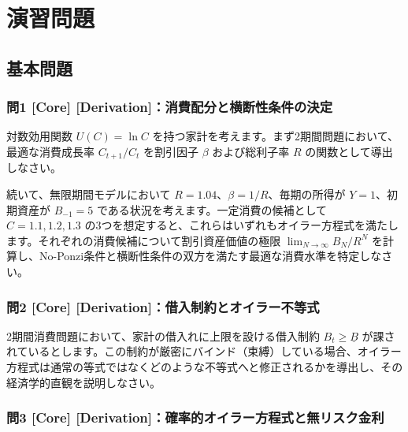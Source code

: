 \documentclass[
  japanese,
  lualatex,
  ja=standard,
  12pt,
  a4paper]{ltjsarticle}
\begin{document}
\section{演習問題}\label{ux6f14ux7fd2ux554fux984c}

\subsection{基本問題}\label{ux57faux672cux554fux984c}

\subsubsection{問1 {[}Core{]}
{[}Derivation{]}：消費配分と横断性条件の決定}\label{ux554f1-core-derivationux6d88ux8cbbux914dux5206ux3068ux6a2aux65adux6027ux6761ux4ef6ux306eux6c7aux5b9a}

対数効用関数 \(U(C) = \ln C\)
を持つ家計を考えます。まず2期間問題において、最適な消費成長率
\(C_{t+1}/C_t\) を割引因子 \(\beta\) および総利子率 \(R\)
の関数として導出しなさい。

続いて、無限期間モデルにおいて \(R=1.04\)、\(\beta=1/R\)、毎期の所得が
\(Y=1\)、初期資産が \(B_{-1}=5\)
である状況を考えます。一定消費の候補として \(C=1.1, 1.2, 1.3\)
の3つを想定すると、これらはいずれもオイラー方程式を満たします。それぞれの消費候補について割引資産価値の極限
\(\lim_{N\to\infty} B_N/R^N\)
を計算し、No-Ponzi条件と横断性条件の双方を満たす最適な消費水準を特定しなさい。

\subsubsection{問2 {[}Core{]}
{[}Derivation{]}：借入制約とオイラー不等式}\label{ux554f2-core-derivationux501fux5165ux5236ux7d04ux3068ux30aaux30a4ux30e9ux30fcux4e0dux7b49ux5f0f}

2期間消費問題において、家計の借入れに上限を設ける借入制約
\(B_t \geq \underline{B}\)
が課されているとします。この制約が厳密にバインド（束縛）している場合、オイラー方程式は通常の等式ではなくどのような不等式へと修正されるかを導出し、その経済学的直観を説明しなさい。

\subsubsection{問3 {[}Core{]}
{[}Derivation{]}：確率的オイラー方程式と無リスク金利}\label{ux554f3-core-derivationux78baux7387ux7684ux30aaux30a4ux30e9ux30fcux65b9ux7a0bux5f0fux3068ux7121ux30eaux30b9ux30afux91d1ux5229}
\end{document}
